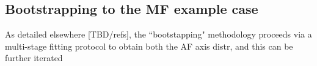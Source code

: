 \subsection{Bootstrapping to the MF example case}

As detailed elsewhere [TBD/refs], the ``bootstapping" methodology proceeds via a multi-stage fitting protocol to obtain both the AF axis distr, and this can be further iterated
